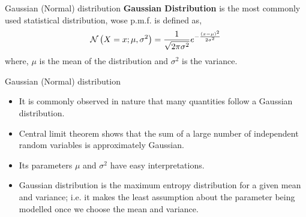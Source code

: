\documentclass[aspectratio=169]{beamer}
\let\olditem\item
\renewcommand{\item}{\setlength{\itemsep}{\fill}\olditem}
\def\mc{\ensuremath\mathcal}
\def\lp{\ensuremath\left(}
\def\rp{\ensuremath\right)}
\newcommand{\ct}[1]{\lp #1\rp}
\begin{document}
\begin{frame}{Gaussian (Normal) distribution}
  \textbf{Gaussian Distribution} is the most commonly used statistical distribution, wose p.m.f. is defined as,
  \[ \mc{N}\ct{X=x; \mu, \sigma^2 } = \frac{1}{\sqrt{2\pi\sigma^2}} e^{-\frac{\ct{x - \mu}^2}{2\sigma^2}} \]
  where, $\mu$ is the mean of the distribution and $\sigma^2$ is the variance.
  \vspace{0.1cm}

  \begin{center}
  \end{center}
\end{frame}


\begin{frame}{Gaussian (Normal) distribution}
  \begin{itemize}
    \item It is commonly observed in nature that many quantities follow a Gaussian distribution.
    \item Central limit theorem shows that the sum of a large number of independent random variables is approximately Gaussian.
    \item Its parameters $\mu$ and $\sigma^2$ have easy interpretations.
    \item Gaussian distribution is the maximum entropy distribution for a given mean and variance; i.e. it makes the least assumption about the parameter being modelled once we choose the mean and variance.
  \end{itemize}
\end{frame}
\end{document}
